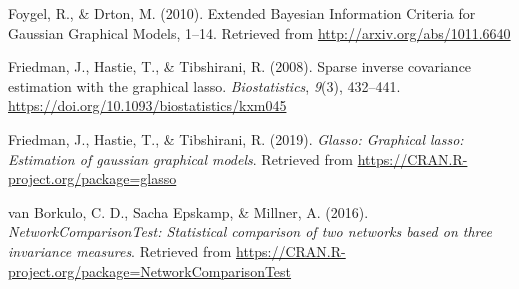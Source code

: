 \documentclass[
  english,
  man,floatsintext]{apa6}
\begin{document}
\leavevmode\hypertarget{ref-foygel_extended_2010}{}%
Foygel, R., \& Drton, M. (2010). Extended Bayesian Information Criteria for Gaussian Graphical Models, 1--14. Retrieved from \url{http://arxiv.org/abs/1011.6640}

\leavevmode\hypertarget{ref-friedman_sparse_2008}{}%
Friedman, J., Hastie, T., \& Tibshirani, R. (2008). Sparse inverse covariance estimation with the graphical lasso. \emph{Biostatistics}, \emph{9}(3), 432--441. \url{https://doi.org/10.1093/biostatistics/kxm045}

\leavevmode\hypertarget{ref-R-glasso}{}%
Friedman, J., Hastie, T., \& Tibshirani, R. (2019). \emph{Glasso: Graphical lasso: Estimation of gaussian graphical models}. Retrieved from \url{https://CRAN.R-project.org/package=glasso}

\leavevmode\hypertarget{ref-R-NetworkComparisonTest}{}%
van Borkulo, C. D., Sacha Epskamp, \& Millner, A. (2016). \emph{NetworkComparisonTest: Statistical comparison of two networks based on three invariance measures}. Retrieved from \url{https://CRAN.R-project.org/package=NetworkComparisonTest}

\endgroup
\end{document}
